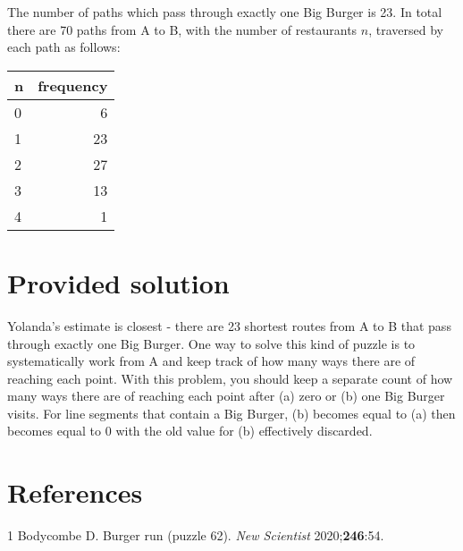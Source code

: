 \documentclass[
]{article}
\begin{document}
The number of paths which pass through exactly one Big Burger is 23. In
total there are 70 paths from A to B, with the number of restaurants
\(n\), traversed by each path as follows:

\begin{longtable}[]{@{}lr@{}}
\toprule
n & frequency\tabularnewline
\midrule
\endhead
0 & 6\tabularnewline
1 & 23\tabularnewline
2 & 27\tabularnewline
3 & 13\tabularnewline
4 & 1\tabularnewline
\bottomrule
\end{longtable}

\hypertarget{provided-solution}{%
\section{Provided solution}\label{provided-solution}}

Yolanda's estimate is closest - there are 23 shortest routes from A to B
that pass through exactly one Big Burger. One way to solve this kind of
puzzle is to systematically work from A and keep track of how many ways
there are of reaching each point. With this problem, you should keep a
separate count of how many ways there are of reaching each point after
(a) zero or (b) one Big Burger visits. For line segments that contain a
Big Burger, (b) becomes equal to (a) then becomes equal to 0 with the
old value for (b) effectively discarded.

\hypertarget{references}{%
\section*{References}\label{references}}

\hypertarget{refs}{}
\leavevmode\hypertarget{ref-bodycombe:2020a}{}%
1 Bodycombe D. Burger run (puzzle 62). \emph{New Scientist}
2020;\textbf{246}:54.
\end{document}

